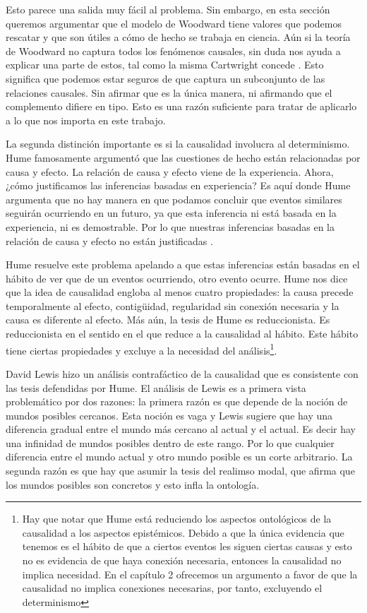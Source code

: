 {Esto parece una salida muy fácil al problema. Sin embargo, en esta sección queremos argumentar que el modelo de Woodward tiene valores que podemos rescatar y que son útiles a cómo de hecho se trabaja en ciencia. Aún si la teoría de Woodward no captura todos los fenómenos causales, sin duda nos ayuda a explicar una parte de estos, tal como la misma Cartwright concede \citeyear[cap. 7]{Cartwright2007}. Esto significa que podemos estar seguros de que captura un subconjunto de las relaciones causales. Sin afirmar que es la única manera, ni afirmando que el complemento difiere en tipo. Esto es una razón suficiente para tratar de aplicarlo a lo que nos importa en este trabajo.

La segunda distinción importante es si la causalidad involucra al determinismo. Hume famosamente argumentó que las cuestiones de hecho están relacionadas por causa y efecto. La relación de causa y efecto viene de la experiencia. Ahora, ¿cómo justificamos las inferencias basadas en experiencia? Es aquí donde Hume argumenta que no hay manera en que podamos concluir que eventos similares seguirán ocurriendo en un futuro, ya que esta inferencia ni está basada en la experiencia, ni es demostrable. Por lo que nuestras inferencias basadas en la relación de causa y efecto no están justificadas \cite{Hume2017}.

Hume resuelve este problema apelando a que estas inferencias están basadas en el hábito de ver que de un eventos ocurriendo, otro evento ocurre. Hume nos dice que la idea de causalidad engloba al menos cuatro propiedades: la causa precede temporalmente al efecto, contigüidad, regularidad sin conexión necesaria y la causa es diferente al efecto. Más aún, la tesis de Hume es reduccionista. Es reduccionista en el sentido en el que reduce a la causalidad al hábito. Este hábito tiene ciertas propiedades y excluye a la necesidad del análisis\footnote{Hay que notar que Hume está reduciendo los aspectos ontológicos de la causalidad a los aspectos epistémicos. Debido a que la única evidencia que tenemos es el hábito de que a ciertos eventos les siguen ciertas causas y esto no es evidencia de que haya conexión necesaria, entonces la causalidad no implica necesidad. En el capítulo 2 ofrecemos un argumento a favor de que la causalidad no implica conexiones necesarias, por tanto, excluyendo el determinismo}.

David Lewis \citeyear{Lewis1973a} hizo un análisis contrafáctico de la causalidad que es consistente con las tesis defendidas por Hume. El análisis de Lewis es a primera vista problemático por dos razones: la primera razón es que depende de la noción de mundos posibles cercanos. Esta noción es vaga y Lewis sugiere que hay una diferencia gradual entre el mundo más cercano al actual y el actual. Es decir hay una infinidad de mundos posibles dentro de este rango. Por lo que cualquier diferencia entre el mundo actual y otro mundo posible es un corte arbitrario. La segunda razón es que hay que asumir la tesis del realimso modal, que afirma que los mundos posibles son concretos y esto infla la ontología.

}
